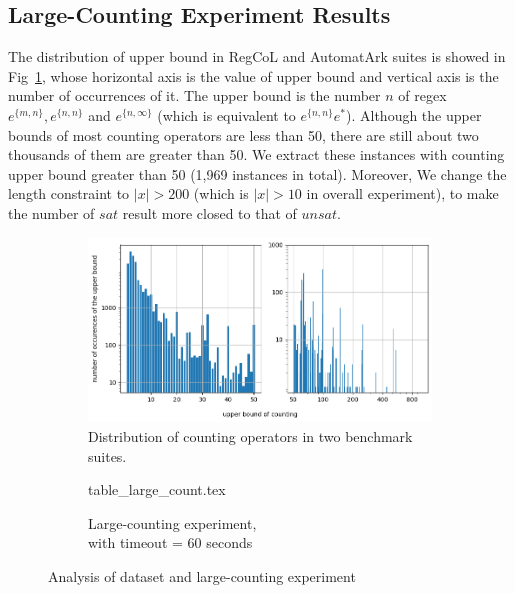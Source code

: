 \vspace{-3mm}
\subsection{Large-Counting Experiment Results}
The distribution of upper bound in RegCoL and AutomatArk suites is showed in Fig~\ref{fig:count_distri}, whose horizontal axis is the value of upper bound and vertical axis is the number of occurrences of it. The upper bound is the number $n$ of regex $e^{\{m,n\}}, e^{\{n,n\}}$ and $e^{\{n,\infty\}}$ (which is equivalent to $e^{\{n,n\}}e^*$). Although the upper bounds of most counting operators are less than 50, there are still about two thousands of them are greater than 50. We extract these instances with counting upper bound greater than 50 (1,969 instances in total). Moreover, We change the length constraint to $|x| > 200$ (which is $|x| > 10$ in overall experiment), to make the number of $sat$ result more closed to that of $unsat$.
\vspace{-5mm}
\begin{figure}[ht]
  \centering
  \begin{subfigure}[t]{0.49\textwidth}
    \centering\vskip 0pt
    \includegraphics[width=1\textwidth]{counting_distribution.png}  
    \caption{Distribution of counting operators in two benchmark suites.}  
    \label{fig:count_distri}
  \end{subfigure}
  \hfill
  \begin{subfigure}[t]{0.49\textwidth}
    \centering\vskip 0pt
    {table_large_count.tex}
    \vspace{4.5mm}
    \caption{Large-counting experiment, \\with timeout = 60 seconds}
    \label{fig:table_large_count}
  \end{subfigure}
  \caption{Analysis of dataset and large-counting experiment}
\end{figure}
\vspace{-7mm}

